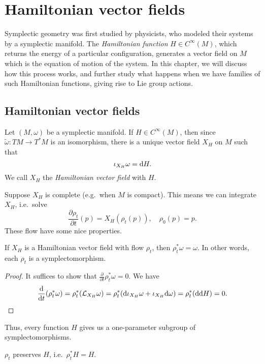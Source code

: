 \documentclass[a4paper]{article}
\begin{document}
\section{Hamiltonian vector fields}
Symplectic geometry was first studied by physicists, who modeled their systems by a symplectic manifold. The \emph{Hamiltonian function} $H \in C^\infty(M)$, which returns the energy of a particular configuration, generates a vector field on $M$ which is the equation of motion of the system. In this chapter, we will discuss how this process works, and further study what happens when we have families of such Hamiltonian functions, giving rise to Lie group actions.

\subsection{Hamiltonian vector fields}
\begin{defi}
  Let $(M, \omega)$ be a symplectic manifold. If $H \in C^\infty(M)$, then since $\tilde{\omega}: TM \to T^*M$ is an isomorphism, there is a unique vector field $X_H$ on $M$ such that
  \[
    \iota_{X_H} \omega = \mathrm{d} H.
  \]
  We call $X_H$ the \emph{Hamiltonian vector field} with  $H$.
\end{defi}

Suppose $X_H$ is complete (e.g.\ when $M$ is compact). This means we can integrate $X_H$, i.e.\ solve
\[
  \frac{\partial \rho_t}{\partial t} (p) = X_H(\rho_t(p)),\quad \rho_0(p) = p.
\]
These flow have some nice properties.
\begin{prop}
  If $X_H$ is a Hamiltonian vector field with flow $\rho_t$, then $\rho_t^* \omega = \omega$. In other words, each $\rho_t$ is a symplectomorphism.
\end{prop}

\begin{proof}
  It suffices to show that $\frac{\partial}{\partial t} \rho_t^* \omega = 0$. We have
  \[
    \frac{\mathrm{d}}{\mathrm{d} t} (\rho_t^* \omega) = \rho_t^* (\mathcal{L}_{X_H} \omega) = \rho_t^* (\mathrm{d} \iota_{X_H} \omega + \iota_{X_H} \mathrm{d} \omega) = \rho_t^* (\mathrm{d} \mathrm{d} H) = 0.\qedhere
  \]
\end{proof}

Thus, every function $H$ gives us a one-parameter subgroup of symplectomorphisms.

\begin{prop}
  $\rho_t$ preserves $H$, i.e.\ $\rho_t^* H = H$.
\end{prop}
\end{document}
